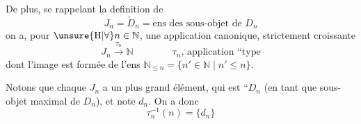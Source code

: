 De plus, se rappelant la definition de
\[
 J_n=\widetilde D_n=\text{ens des sous-objet de }D_n
\]
on a, pour \(\unsure{\mathrm{H}|\forall} n\in\mathbb N\), une application canonique, strictement croissante
\[
 J_n\xrightarrow{\tau_n}\mathbb N \qquad\qquad
 \text{\(\tau_n\), application ``type}
\]
dont l'image est formée  de l'ens
\(\mathbb N_{\leq n}=\{n'\in\mathbb N\mid n'\leq n\}\).

Notons que chaque \(J_n\) a un plus grand élément, qui est ``\(D_n\) (en tant que  sous-objet maximal de \(D_n\)), et  note \(d_n\). On a donc 
\[
 \tau_n^{-1}(n)=\{d_n\}
\]

